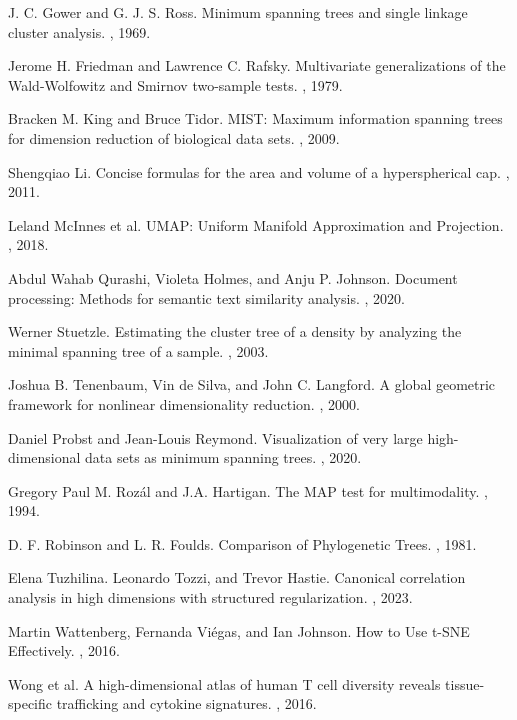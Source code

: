 \documentclass{article}
\begin{document}
\begin{thebibliography}{99}
J. C. Gower and G. J. S. Ross.
\newblock Minimum spanning trees and single linkage cluster analysis.
, 1969.

Jerome H. Friedman and Lawrence C. Rafsky.
\newblock Multivariate generalizations of the Wald-Wolfowitz and Smirnov two-sample tests.
, 1979.

Bracken M. King and Bruce Tidor.
\newblock MIST: Maximum information spanning trees for dimension reduction of biological data sets.
, 2009.

Shengqiao Li.
\newblock Concise formulas for the area and volume of a hyperspherical cap.
, 2011.

Leland McInnes et al.
\newblock UMAP: Uniform Manifold Approximation and Projection.
, 2018.

Abdul Wahab Qurashi, Violeta Holmes, and Anju P. Johnson.
\newblock Document processing: Methods for semantic text similarity analysis.
, 2020.

Werner Stuetzle.
\newblock Estimating the cluster tree of a density by analyzing the minimal spanning tree of a sample.
, 2003.

Joshua B. Tenenbaum, Vin de Silva, and John C. Langford.
\newblock A global geometric framework for nonlinear dimensionality reduction.
, 2000.

Daniel Probst and Jean-Louis Reymond.
\newblock Visualization of very large high-dimensional data sets as minimum spanning trees.
, 2020.

Gregory Paul M. Roz\'al and J.A. Hartigan.
\newblock The MAP test for multimodality.
, 1994.

D. F. Robinson and L. R. Foulds.
\newblock Comparison of Phylogenetic Trees.
, 1981.

Elena Tuzhilina. Leonardo Tozzi, and Trevor Hastie.
\newblock Canonical correlation analysis in high dimensions with structured regularization.
, 2023.

Martin Wattenberg, Fernanda Vi\'egas, and Ian Johnson.
\newblock How to Use t-SNE Effectively.
, 2016.

Wong et al.
\newblock A high-dimensional atlas of human T cell diversity reveals tissue-specific trafficking and cytokine signatures.
, 2016.

\end{thebibliography}
\end{document}
